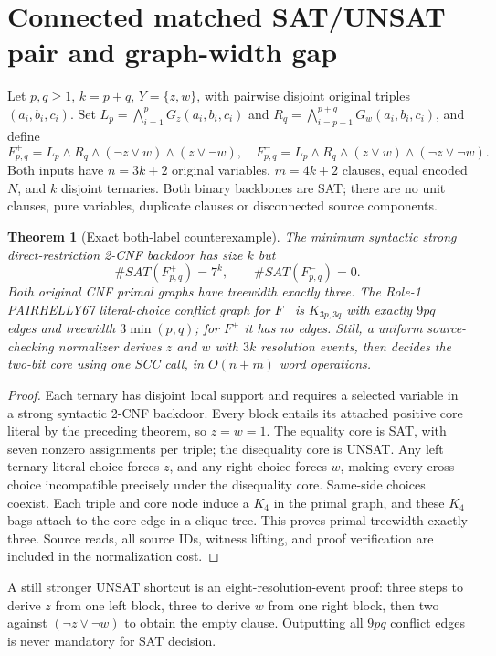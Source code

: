\documentclass[11pt]{article}
\newtheorem{theorem}{Theorem}
\begin{document}
\section{Connected matched SAT/UNSAT pair and graph-width gap}
Let $p,q\ge1$, $k=p+q$, $Y=\{z,w\}$, with pairwise disjoint original triples $(a_i,b_i,c_i)$. Set $L_p=\bigwedge_{i=1}^{p}G_z(a_i,b_i,c_i)$ and $R_q=\bigwedge_{i=p+1}^{p+q}G_w(a_i,b_i,c_i)$, and define
\[
F_{p,q}^{+}=L_p\wedge R_q\wedge(\neg z\vee w)\wedge(z\vee\neg w),
\quad
F_{p,q}^{-}=L_p\wedge R_q\wedge(z\vee w)\wedge(\neg z\vee\neg w).
\]
Both inputs have $n=3k+2$ original variables, $m=4k+2$ clauses, equal encoded $N$, and $k$ disjoint ternaries. Both binary backbones are SAT; there are no unit clauses, pure variables, duplicate clauses or disconnected source components.
\begin{theorem}[Exact both-label counterexample]
The minimum syntactic strong direct-restriction 2-CNF backdoor has size $k$ but
\[
\#SAT(F_{p,q}^{+})=7^k,\qquad
\#SAT(F_{p,q}^{-})=0.
\]
Both original CNF primal graphs have treewidth exactly three. The Role-1 PAIRHELLY67 literal-choice conflict graph for $F^{-}$ is $K_{3p,3q}$ with exactly $9pq$ edges and treewidth $3\min(p,q)$; for $F^{+}$ it has no edges. Still, a uniform source-checking normalizer derives $z$ and $w$ with $3k$ resolution events, then decides the two-bit core using one SCC call, in $O(n+m)$ word operations.
\end{theorem}
\begin{proof}
Each ternary has disjoint local support and requires a selected variable in a strong syntactic 2-CNF backdoor. Every block entails its attached positive core literal by the preceding theorem, so $z=w=1$. The equality core is SAT, with seven nonzero assignments per triple; the disequality core is UNSAT. Any left ternary literal choice forces $z$, and any right choice forces $w$, making every cross choice incompatible precisely under the disequality core. Same-side choices coexist. Each triple and core node induce a $K_4$ in the primal graph, and these $K_4$ bags attach to the core edge in a clique tree. This proves primal treewidth exactly three. Source reads, all source IDs, witness lifting, and proof verification are included in the normalization cost.
\end{proof}
A still stronger UNSAT shortcut is an eight-resolution-event proof: three steps to derive $z$ from one left block, three to derive $w$ from one right block, then two against $(\neg z\vee\neg w)$ to obtain the empty clause. Outputting all $9pq$ conflict edges is never mandatory for SAT decision.
\end{document}
